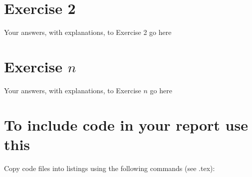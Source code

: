 \documentclass{article}
\begin{document}
\section*{Exercise 2}

Your answers, with explanations, to Exercise 2 go here

\section*{Exercise $n$}

Your answers, with explanations, to Exercise $n$ go here


\section*{To include code in your report use this}

Copy code files into listings using the following commands (see .tex):
\end{document}
